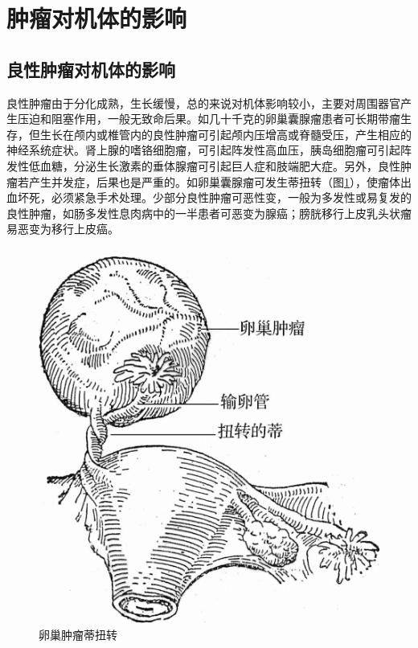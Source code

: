 \section{肿瘤对机体的影响}

\subsection{良性肿瘤对机体的影响}

良性肿瘤由于分化成熟，生长缓慢，总的来说对机体影响较小，主要对周围器官产生压迫和阻塞作用，一般无致命后果。如几十千克的卵巢囊腺瘤患者可长期带瘤生存，但生长在颅内或椎管内的良性肿瘤可引起颅内压增高或脊髓受压，产生相应的神经系统症状。肾上腺的嗜铬细胞瘤，可引起阵发性高血压，胰岛细胞瘤可引起阵发性低血糖，分泌生长激素的垂体腺瘤可引起巨人症和肢端肥大症。另外，良性肿瘤若产生并发症，后果也是严重的。如卵巢囊腺瘤可发生蒂扭转（图\ref{fig5-11}），使瘤体出血坏死，必须紧急手术处理。少部分良性肿瘤可恶性变，一般为多发性或易复发的良性肿瘤，如肠多发性息肉病中的一半患者可恶变为腺癌；膀胱移行上皮乳头状瘤易恶变为移行上皮癌。

\begin{figure}[!htbp]
 \centering
 \includegraphics[scale=1.2]{./images/Image00078.jpg}
 \caption{卵巢肿瘤蒂扭转}
 \label{fig5-11}
  \end{figure}

